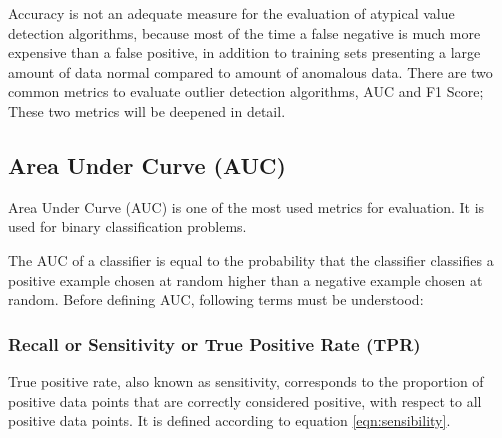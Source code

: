 Accuracy is not an adequate measure for the evaluation of atypical value detection algorithms, because most of the time a false negative is much more expensive than a false positive, in addition to training sets presenting a large amount of data normal compared to amount of anomalous data. There are two common metrics to evaluate outlier detection algorithms, AUC and F1 Score; These two metrics will be deepened in detail.

\subsection{Area Under Curve (AUC)}

Area Under Curve (AUC) is one of the most used metrics for evaluation. It is used for binary classification problems.

\vspace{5mm} %

The AUC of a classifier is equal to the probability that the classifier classifies a positive example chosen at random higher than a negative example chosen at random. Before defining AUC, following terms must be understood:

\subsubsection{Recall or Sensitivity or True Positive Rate (TPR)}

True positive rate, also known as sensitivity, corresponds to the proportion of positive data points that are correctly considered positive, with respect to all positive data points. It is defined according to equation \ref{eqn:sensibility}.

